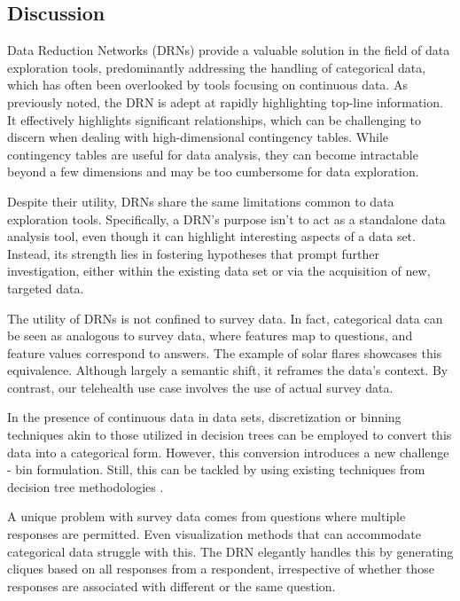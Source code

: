 \subsection{Discussion} \label{Discussion}

Data Reduction Networks (DRNs) provide a valuable solution in the field of data exploration tools, predominantly addressing the handling of categorical data, which has often been overlooked by tools focusing on continuous data. As previously noted, the DRN is adept at rapidly highlighting top-line information. It effectively highlights significant relationships, which can be challenging to discern when dealing with high-dimensional contingency tables. While contingency tables are useful for data analysis, they can become intractable beyond a few dimensions and may be too cumbersome for data exploration.

Despite their utility, DRNs share the same limitations common to data exploration tools. Specifically, a DRN's purpose isn't to act as a standalone data analysis tool, even though it can highlight interesting aspects of a data set. Instead, its strength lies in fostering hypotheses that prompt further investigation, either within the existing data set or via the acquisition of new, targeted data.

The utility of DRNs is not confined to survey data. In fact, categorical data can be seen as analogous to survey data, where features map to questions, and feature values correspond to answers. The example of solar flares showcases this equivalence. Although largely a semantic shift, it reframes the data's context. By contrast, our telehealth use case involves the use of actual survey data.

In the presence of continuous data in data sets, discretization or binning techniques akin to those utilized in decision trees can be employed to convert this data into a categorical form. However, this conversion introduces a new challenge - bin formulation. Still, this can be tackled by using existing techniques from decision tree methodologies \citep{garcia}.

A unique problem with survey data comes from questions where multiple responses are permitted. Even visualization methods that can accommodate categorical data struggle with this. The DRN elegantly handles this by generating cliques based on all responses from a respondent, irrespective of whether those responses are associated with different or the same question.

